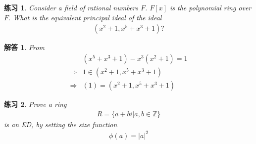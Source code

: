 \documentclass[utf8]{ctexbook}
\newtheorem{exercise}{练习}[section]
\newtheorem*{soln}{解答}
\begin{document}
\begin{exercise}
Consider a field of rational numbers $F$. $F[x]$ is the polynomial ring over $F$. What is the equivalent principal ideal of the ideal
\begin{align*}
( x^2 + 1, x^5 + x^3 + 1 ) ?
\end{align*}
\end{exercise}

\begin{soln}
From
\begin{align*}
& (x^5 + x^3 + 1  ) - x^3 (x^2 + 1) = 1 \\
\Longrightarrow & 1 \in ( x^2 + 1, x^5 + x^3 + 1 ) \\
\Longrightarrow & (1) = ( x^2 + 1, x^5 + x^3 + 1 )
\end{align*}

\end{soln}

\begin{exercise}
Prove a ring 
\begin{align*}
R= \{ a + b i | a, b \in \mathbb{Z} \}
\end{align*}
is an ED, by setting the size function
\begin{align*}
\phi(a) = |a|^2
\end{align*}

\end{exercise}
\end{document}
